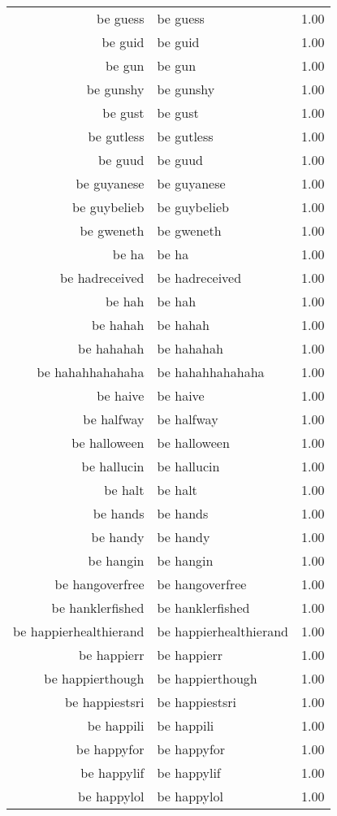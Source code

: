 \begin{table}[ht]
\begin{tabular}{rlr}
  be guess & be guess & 1.00 \\ 
  be guid & be guid & 1.00 \\ 
  be gun & be gun & 1.00 \\ 
  be gunshy & be gunshy & 1.00 \\ 
  be gust & be gust & 1.00 \\ 
  be gutless & be gutless & 1.00 \\ 
  be guud & be guud & 1.00 \\ 
  be guyanese & be guyanese & 1.00 \\ 
  be guybelieb & be guybelieb & 1.00 \\ 
  be gweneth & be gweneth & 1.00 \\ 
  be ha & be ha & 1.00 \\ 
  be hadreceived & be hadreceived & 1.00 \\ 
  be hah & be hah & 1.00 \\ 
  be hahah & be hahah & 1.00 \\ 
  be hahahah & be hahahah & 1.00 \\ 
  be hahahhahahaha & be hahahhahahaha & 1.00 \\ 
  be haive & be haive & 1.00 \\ 
  be halfway & be halfway & 1.00 \\ 
  be halloween & be halloween & 1.00 \\ 
  be hallucin & be hallucin & 1.00 \\ 
  be halt & be halt & 1.00 \\ 
  be hands & be hands & 1.00 \\ 
  be handy & be handy & 1.00 \\ 
  be hangin & be hangin & 1.00 \\ 
  be hangoverfree & be hangoverfree & 1.00 \\ 
  be hanklerfished & be hanklerfished & 1.00 \\ 
  be happierhealthierand & be happierhealthierand & 1.00 \\ 
  be happierr & be happierr & 1.00 \\ 
  be happierthough & be happierthough & 1.00 \\ 
  be happiestsri & be happiestsri & 1.00 \\ 
  be happili & be happili & 1.00 \\ 
  be happyfor & be happyfor & 1.00 \\ 
  be happylif & be happylif & 1.00 \\ 
  be happylol & be happylol & 1.00 \\ 

\end{tabular}
\end{table}
